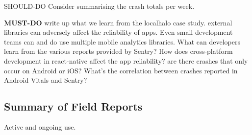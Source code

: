 SHOULD-DO Consider summarising the crash totals per week. 

\textbf{MUST-DO} write up what we learn from the localhalo case study. external libraries can adversely affect the reliability of apps. Even small development teams can and do use multiple mobile analytics libraries. What can developers learn from the various reports provided by Sentry? How does cross-platform development in react-native affect the app reliability? are there crashes that only occur on Android or iOS? What's the correlation between crashes reported in Android Vitals and Sentry?


\subsection{Summary of Field Reports}
Active and ongoing use. 